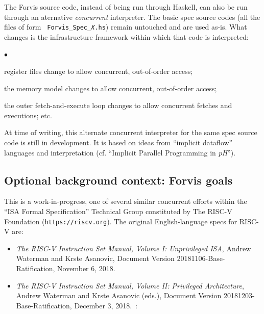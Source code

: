 \documentclass[11pt]{article}
\newenvironment{tightlist}%
{\begin{list}{$\bullet$}{%
    \setlength{\topsep}{0in}
    \setlength{\partopsep}{0in}
    \setlength{\itemsep}{0in}
    \setlength{\parsep}{0in}
    \setlength{\leftmargin}{1.5em}
    \setlength{\rightmargin}{0in}
    \setlength{\itemindent}{0in}
}
}%
{\end{list}
}
\begin{document}
The Forvis source code, instead of being run through Haskell, can also
be run through an aternative \emph{concurrent} interpreter.  The basic
spec source codes (all the files of form {\tt
Forvis\_Spec\_{\it{}X}.hs}) remain untouched and are used as-is.  What
changes is the infrastructure framework within which that code is
interpreted:
\begin{tightlist}

\item register files change to allow concurrent, out-of-order access;

\item the memory model changes to allow concurrent, out-of-order access;

\item the outer fetch-and-execute loop changes to allow concurrent fetches and executions; etc.

\end{tightlist}

At time of writing, this alternate concurrent interpreter for the same
spec source code is still in development.  It is based on ideas from
``implicit dataflow'' languages and interpretation (cf.  ``Implicit
Parallel Programming in \emph{pH}''\cite{Nikhil2000a}).


\subsection{Optional background context: Forvis goals}

This is a work-in-progress, one of several similar concurrent efforts
within the ``ISA Formal Specification'' Technical Group constituted by
The RISC-V Foundation ({\tt https://riscv.org}).  The original
English-language specs for RISC-V are:
\begin{itemize}

\item {\it The RISC-V Instruction Set Manual, Volume I: Unprivileged ISA},
    Andrew Waterman and Krste Asanovic,
    Document Version 20181106-Base-Ratification,
    November 6, 2018.~\cite{Waterman2018_user}

\item {\it The RISC-V Instruction Set Manual, Volume II: Privileged
    Architecture}, 
    Andrew Waterman and Krste Asanovic (eds.),
    Document Version 20181203-Base-Ratification,
    December 3, 2018.~\cite{Waterman2018_priv}:

\end{itemize}
\end{document}
